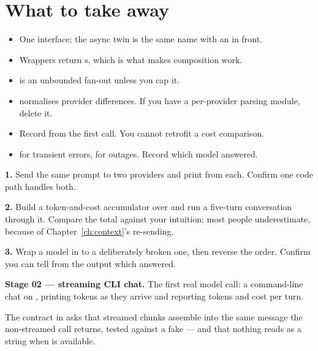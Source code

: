 \section{What to take away}
\label{sec:ch5-summary}

\begin{itemize}[leftmargin=1.4em]
\item One interface; the async twin is the same name with an  in front.
\item Wrappers return s, which is what makes composition work.
\item {} is an unbounded fan-out unless you cap it.
\item {} normalises provider differences. If you have a
      per-provider parsing module, delete it.
\item Record  from the first call. You cannot retrofit a
      cost comparison.
\item {} for transient errors,  for
      outages. Record which model answered.
\end{itemize}

\begin{exercisebox}
\textbf{1.} Send the same prompt to two providers and print
 from each. Confirm one code path handles both.

\textbf{2.} Build a token-and-cost accumulator over  and
run a five-turn conversation through it. Compare the total against your
intuition; most people underestimate, because of
Chapter~\ref{ch:context}'s re-sending.

\textbf{3.} Wrap a model in  to a deliberately broken one,
then reverse the order. Confirm you can tell from the output which answered.
\end{exercisebox}

\begin{projectbox}
\textbf{Stage 02 --- streaming CLI chat.} The first real model call: a
command-line chat on , printing tokens as they arrive and
reporting tokens and cost per turn.

The contract in  asks that streamed
chunks assemble into the same message the non-streamed call returns, tested
against a fake --- and that nothing reads  as a string when
 is available.
\end{projectbox}
